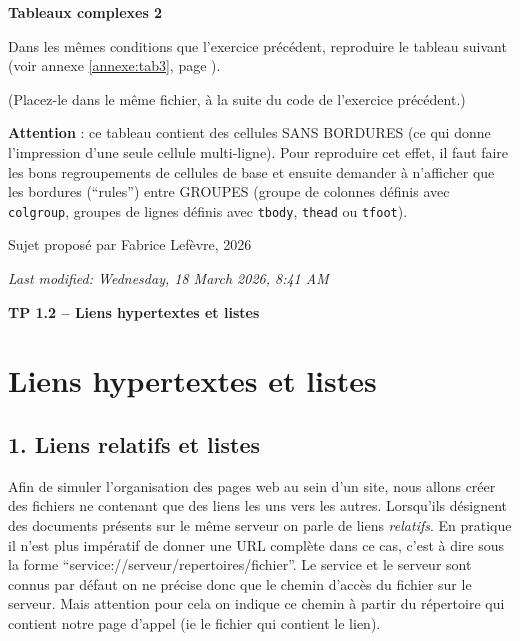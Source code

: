 \documentclass[a4paper,11pt]{article}
\begin{document}
\begin{afaire}
\textbf{Tableaux complexes 2}

Dans les mêmes conditions que l'exercice précédent, reproduire le tableau suivant
(voir annexe \ref{annexe:tab3}, page \pageref{annexe:tab3}).

(Placez-le dans le même fichier, à la suite du code de l'exercice précédent.)

\textcolor{rougetitre}{\textbf{Attention}} : ce tableau contient des cellules SANS BORDURES (ce qui donne l'impression d'une seule cellule multi-ligne). Pour reproduire cet effet, il faut faire les bons regroupements de cellules de base et ensuite demander à n'afficher que les bordures (``rules'') entre GROUPES (groupe de colonnes définis avec \texttt{colgroup}, groupes de lignes définis avec \texttt{tbody}, \texttt{thead} ou \texttt{tfoot}).

\end{afaire}

\vspace{1em}
\noindent\textcopyright{} Sujet proposé par Fabrice Lefèvre, 2026

\vspace{0.5em}
\noindent\textit{Last modified: Wednesday, 18 March 2026, 8:41 AM}

\newpage
{}

{\Large\bfseries TP 1.2 -- Liens hypertextes et listes}

\bigskip

\section{Liens hypertextes et listes}

\subsection{1. Liens relatifs et listes}

Afin de simuler l'organisation des pages web au sein d'un site, nous allons créer des fichiers ne contenant que des liens les uns vers les autres. Lorsqu'ils désignent des documents présents sur le même serveur on parle de liens \textit{relatifs}. En pratique il n'est plus impératif de donner une URL complète dans ce cas, c'est à dire sous la forme ``service://serveur/repertoires/fichier''. Le service et le serveur sont connus par défaut on ne précise donc que le chemin d'accès du fichier sur le serveur. Mais attention pour cela on indique ce chemin à partir du répertoire qui contient notre page d'appel (ie le fichier qui contient le lien).
\end{document}
